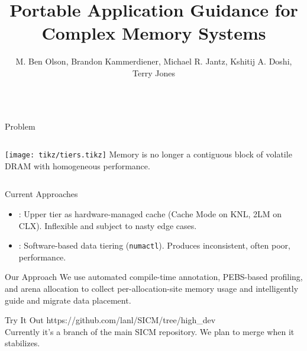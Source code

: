 \documentclass[final,hyperref={pdfpagelabels=false}]{beamer}
\title{Portable Application Guidance for Complex Memory Systems}
\author{M. Ben Olson, Brandon Kammerdiener, Michael R. Jantz, Kshitij A. Doshi, Terry Jones}
\begin{document}
\begin{frame}{}
\begin{columns}[t]
  \begin{column}{.45\linewidth}

    \begin{block}{Problem}
      \begin{columns}%
        \texttt{[image: tikz/tiers.tikz]}
        Memory is no longer a contiguous block of
        volatile DRAM with homogeneous performance.
      \end{columns}%
      \vspace{1mm}%
    \end{block}

    \begin{block}{Current Approaches}
      \begin{itemize}
				\item {}:
          Upper tier as hardware-managed cache (Cache Mode on KNL, 2LM on CLX).
          Inflexible and subject to nasty edge cases.
				\item {}:
					Software-based data tiering (\texttt{numactl}). Produces inconsistent, often poor,
          performance.
      \end{itemize}
    \end{block}

    \begin{block}{Our Approach}
      We use automated compile-time annotation, PEBS-based profiling, and arena
      allocation to collect per-allocation-site memory usage and intelligently
      guide and migrate data placement.
      \vspace{1em}
      \begin{center}
        \resizebox{0.85\textwidth}{!}{%
          
        }
      \end{center}
    \end{block}

    \begin{block}{Try It Out}
        https://github.com/lanl/SICM/tree/high\_dev
        \\\vspace{1em}
        Currently it's a branch of the main SICM repository. We plan to merge when it stabilizes.
    \end{block}


  \end{column}
  

\end{columns}
\end{frame}
\end{document}
